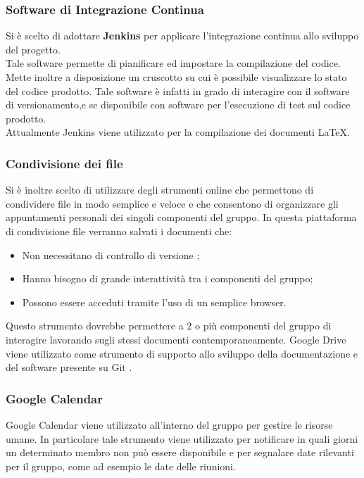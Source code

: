\subsubsection{Software di Integrazione Continua}

Si è scelto di adottare \textbf{Jenkins} per applicare l’integrazione continua allo sviluppo del progetto.\\ 
Tale software permette di pianificare ed impostare la compilazione del codice.\\
Mette inoltre a disposizione un cruscotto su cui è possibile visualizzare lo stato del codice prodotto. Tale software è infatti in grado di interagire con il software di versionamento,e se disponibile con software per l’esecuzione di test sul codice prodotto.\\ 
Attualmente Jenkins viene utilizzato per la compilazione dei documenti \LaTeX. 


\subsubsection{Condivisione dei file}

  Si è inoltre scelto di utilizzare degli strumenti online che permettono di condividere file
  in modo semplice e veloce e che consentono di organizzare gli appuntamenti personali
  dei singoli componenti del gruppo.
  In questa piattaforma di condivisione file verranno salvati i documenti che:
  \begin{itemize}
  
  
  \item Non necessitano di controllo di versione ;
  \item Hanno bisogno di grande interattività tra i componenti del gruppo;
  \item Possono essere acceduti tramite l’uso di un semplice browser.
   \end{itemize}
  Questo strumento dovrebbe permettere a 2 o più componenti del gruppo di interagire
  lavorando sugli stessi documenti contemporaneamente. Google Drive viene utilizzato
  come strumento di supporto allo sviluppo della documentazione e del software presente
  su Git .
  


\subsubsection{Google Calendar}
 
Google Calendar viene utilizzato all’interno del gruppo per gestire le risorse umane. In
particolare tale strumento viene utilizzato per notificare in quali giorni un determinato
membro non può essere disponibile e per segnalare date rilevanti per il gruppo, come
ad esempio le date delle riunioni.



